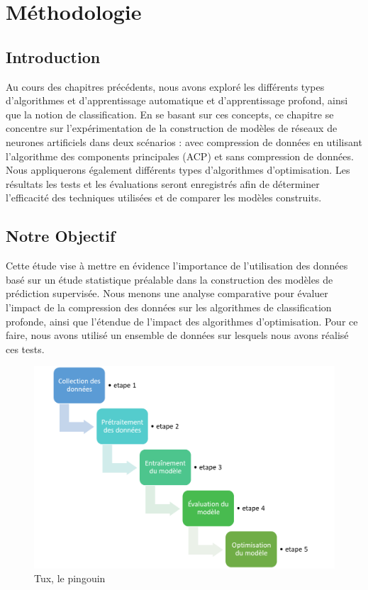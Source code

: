 \chapter{Méthodologie}
\section{Introduction}
Au cours des chapitres précédents, nous avons exploré les différents types d'algorithmes et d'apprentissage automatique et d'apprentissage profond, ainsi que la notion de classification. En se basant sur ces concepts,
ce chapitre se concentre sur l'expérimentation de la construction de modèles de réseaux de neurones artificiels dans deux scénarios : avec compression de données en utilisant l’algorithme des components principales (ACP) et sans compression de données. Nous appliquerons également différents types d'algorithmes d'optimisation. Les résultats les tests et les évaluations seront enregistrés afin de déterminer l'efficacité des techniques utilisées et de comparer les modèles construits.

\section{Notre  Objectif}
Cette étude vise à mettre en évidence l'importance de l'utilisation des données basé
 sur un étude statistique préalable dans la construction des modèles 
 de prédiction supervisée. Nous menons une analyse comparative pour évaluer 
 l'impact de la compression des données sur les algorithmes de classification profonde, ainsi que l'étendue de l'impact des algorithmes d'optimisation. Pour ce faire, nous avons utilisé un ensemble de données sur lesquels nous avons réalisé ces tests.

 \begin{figure}[!p]
    \includegraphics[scale=0.5]{Images/Chapter4/etapes.png}
    \caption{Tux, le pingouin}
    \label{fig:18}
    \end{figure}
